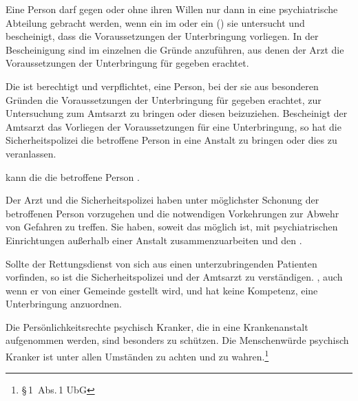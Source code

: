 {%
Eine Person darf gegen oder ohne ihren Willen nur dann in
eine psychiatrische Abteilung gebracht werden, wenn ein im
 oder ein
 () sie untersucht und
bescheinigt, dass die Voraussetzungen der Unterbringung
vorliegen. In der Bescheinigung sind im einzelnen die Gründe
anzuführen, aus denen der Arzt die Voraussetzungen der
Unterbringung für gegeben erachtet.



Die  ist berechtigt und verpflichtet,
eine Person, bei der sie aus besonderen Gründen die
Voraussetzungen der Unterbringung für gegeben erachtet, zur
Untersuchung zum Amtsarzt zu bringen oder diesen
beizuziehen. Bescheinigt der Amtsarzt das Vorliegen der
Voraussetzungen für eine Unterbringung, so hat die
Sicherheitspolizei die betroffene Person in eine Anstalt zu
bringen oder dies zu veranlassen.

 kann die 
die betroffene Person
.

Der Arzt und die Sicherheitspolizei haben unter möglichster
Schonung der betroffenen Person vorzugehen und die notwendigen
Vorkehrungen zur Abwehr von Gefahren zu treffen. Sie haben,
soweit das möglich ist, mit psychiatrischen Einrichtungen
außerhalb einer Anstalt zusammenzuarbeiten und
 den . 

Sollte der Rettungsdienst von sich aus einen
unterzubringenden Patienten vorfinden, so ist die
Sicherheitspolizei und der Amtsarzt zu verständigen.
, auch wenn
er von einer Gemeinde gestellt wird, und
hat keine Kompetenz, eine Unterbringung anzuordnen. 


\begin{Danger}
  \item Die Persönlichkeitsrechte psychisch Kranker, die in
  eine Krankenanstalt aufgenommen werden, sind besonders zu
  schützen. Die Menschenwürde psychisch Kranker ist unter
  allen Umständen zu achten und zu
  wahren.\footnote{{\S}\,1~Abs.\,1 UbG}
\end{Danger}
}
{}
{}
{}
{}




